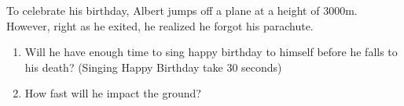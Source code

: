 
\begin{question}
To celebrate his birthday, Albert jumps off a plane at a height of 3000m. However, right as he exited, he realized he forgot his parachute.

\begin{enumerate}[label=(\alph*)]
\item Will he have enough time to sing happy birthday to himself before he falls to his death? (Singing Happy Birthday take 30 seconds)
\item How fast will he impact the ground?
\end{enumerate}

\end{question}

